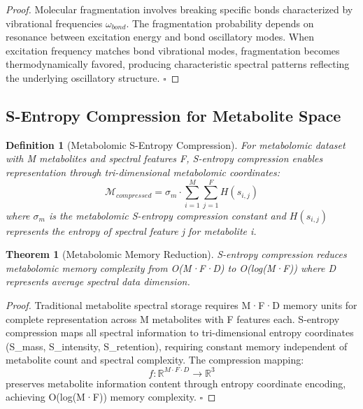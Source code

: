\documentclass[12pt,a4paper]{article}
\newtheorem{theorem}{Theorem}
\newtheorem{definition}{Definition}
\begin{document}
\begin{proof}
Molecular fragmentation involves breaking specific bonds characterized by vibrational frequencies $\omega_{bond}$. The fragmentation probability depends on resonance between excitation energy and bond oscillatory modes. When excitation frequency matches bond vibrational modes, fragmentation becomes thermodynamically favored, producing characteristic spectral patterns reflecting the underlying oscillatory structure. $\square$
\end{proof}

\subsection{S-Entropy Compression for Metabolite Space}

\begin{definition}[Metabolomic S-Entropy Compression]
For metabolomic dataset with M metabolites and spectral features F, S-entropy compression enables representation through tri-dimensional metabolomic coordinates:
\begin{equation}
\mathcal{M}_{compressed} = \sigma_m \cdot \sum_{i=1}^{M} \sum_{j=1}^{F} H(s_{i,j})
\end{equation}
where $\sigma_m$ is the metabolomic S-entropy compression constant and $H(s_{i,j})$ represents the entropy of spectral feature j for metabolite i.
\end{definition}

\begin{theorem}[Metabolomic Memory Reduction]
S-entropy compression reduces metabolomic memory complexity from O(M·F·D) to O(log(M·F)) where D represents average spectral data dimension.
\end{theorem}

\begin{proof}
Traditional metabolite spectral storage requires M·F·D memory units for complete representation across M metabolites with F features each. S-entropy compression maps all spectral information to tri-dimensional entropy coordinates (S_{mass}, S_{intensity}, S_{retention}), requiring constant memory independent of metabolite count and spectral complexity. The compression mapping:
\begin{equation}
f: \mathbb{R}^{M \cdot F \cdot D} \rightarrow \mathbb{R}^3
\end{equation}
preserves metabolite information content through entropy coordinate encoding, achieving O(log(M·F)) memory complexity. $\square$
\end{proof}
\end{document}
